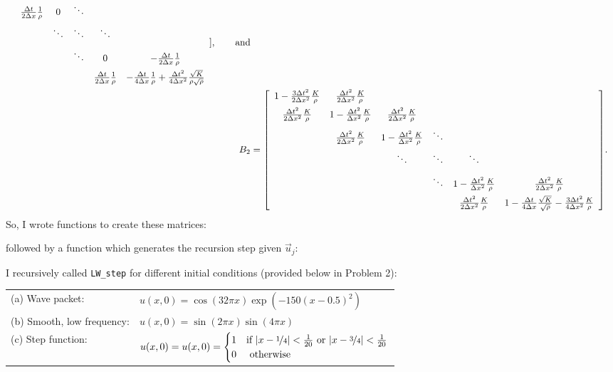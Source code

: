\documentclass{article} %
\theoremstyle{plain}
\newcommand{\Dx}{\Delta x}
\newcommand{\Dt}{\Delta t}
\numberwithin{equation}{section} %
\numberwithin{figure}{section} %
\numberwithin{table}{section} %
\begin{document}
\begin{enumerate}[\ \ (a)]
\begin{align*}
\begin{array}{cccccc}
                & \frac{\Dt}{2\Dx}\frac{1}{\rho} & 0 & \ddots & & \\[.2cm]
                & & \ddots & \ddots & \ddots & \\[.2cm]
                & & & \ddots & 0 & -\frac{\Dt}{2\Dx}\frac{1}{\rho} \\[.2cm]
                & & & & \frac{\Dt}{2\Dx}\frac{1}{\rho} & -\frac{\Dt}{4\Dx}\frac{1}{\rho} + \frac{\Dt^2}{4\Dx^2}\frac{\sqrt{K}}{\rho\sqrt{\rho}}
            \end{array}], \qquad\text{and} \\
            B_2 &= \qty[\begin{array}{cccccc}
                1 - \frac{3\Dt^2}{2\Dx^2}\frac{K}{\rho} & \frac{\Dt^2}{2\Dx^2}\frac{K}{\rho} & & & & \\[.2cm]
                \frac{\Dt^2}{2\Dx^2}\frac{K}{\rho} & 1 - \frac{\Dt^2}{\Dx^2}\frac{K}{\rho} & \frac{\Dt^2}{2\Dx^2}\frac{K}{\rho} & & & \\[.2cm]
                & \frac{\Dt^2}{2\Dx^2}\frac{K}{\rho} & 1 - \frac{\Dt^2}{\Dx^2}\frac{K}{\rho} & \ddots & & \\[.2cm]
                & & \ddots & \ddots & \ddots & \\[.2cm]
                & & & \ddots & 1 - \frac{\Dt^2}{\Dx^2}\frac{K}{\rho} & \frac{\Dt^2}{2\Dx^2}\frac{K}{\rho} \\[.2cm]
                & & & & \frac{\Dt^2}{2\Dx^2}\frac{K}{\rho} & 1 - \frac{\Dt}{4\Dx}\frac{\sqrt{K}}{\sqrt{\rho}} - \frac{3\Dt^2}{4\Dx^2}\frac{K}{\rho}
            \end{array}].
        \end{align*}
        So, I wrote functions to create these matrices:
        
        followed by a function which generates the recursion step given $\vec{u}_j$:
        
        I recursively called \verb|LW_step| for different initial conditions (provided below in Problem 2):

        \begin{tabular}{ll}
            (a) Wave packet: & $u(x,0) = \cos(32\pi x)\exp(-150(x-0.5)^2)$ \\
            (b) Smooth, low frequency: & $u(x,0) = \sin(2\pi x)\sin(4\pi x)$ \\
            (c) Step function: & $u(x,0) = u(x,0) = \begin{cases}1 & \text{if } \abs{x - \nicefrac{1}{4}}<\frac{1}{20} \text{ or } \abs{x - \nicefrac{3}{4}}<\frac{1}{20} \\ 0 & \text{ otherwise} \end{cases}$
        \end{tabular}


\end{enumerate}
\end{document}
